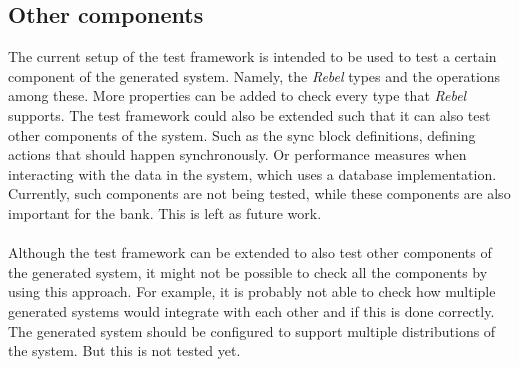\subsection*{Other components}
The current setup of the test framework is intended to be used to test a certain component of the
generated system. Namely, the \textit{Rebel} types and the operations among
these. More properties can be added to check every type that \textit{Rebel}
supports. The test framework could also be extended such that it can also test
other components of the system. Such as the sync block definitions, defining
actions that should happen synchronously. Or performance measures when
interacting with the data in the system, which uses a database implementation.
Currently, such components are not being tested, while these components are also
important for the bank. This is left as future work.\\
\\
Although the test framework can be extended to also test other components of
the generated system, it might not be possible to check all the components by
using this approach. For example, it is probably not able to check how multiple
generated systems would integrate with each other and if this is done correctly.
The generated system should be configured to support multiple distributions of
the system. But this is not tested yet.
